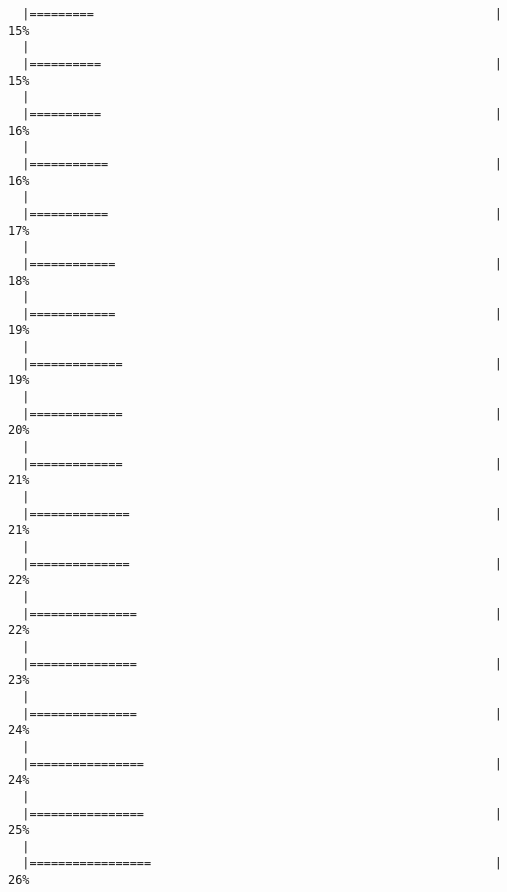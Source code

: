 \begin{knitrout}
\begin{kframe}
\begin{verbatim}
  |=========                                                        |  15%
  |                                                                       
  |==========                                                       |  15%
  |                                                                       
  |==========                                                       |  16%
  |                                                                       
  |===========                                                      |  16%
  |                                                                       
  |===========                                                      |  17%
  |                                                                       
  |============                                                     |  18%
  |                                                                       
  |============                                                     |  19%
  |                                                                       
  |=============                                                    |  19%
  |                                                                       
  |=============                                                    |  20%
  |                                                                       
  |=============                                                    |  21%
  |                                                                       
  |==============                                                   |  21%
  |                                                                       
  |==============                                                   |  22%
  |                                                                       
  |===============                                                  |  22%
  |                                                                       
  |===============                                                  |  23%
  |                                                                       
  |===============                                                  |  24%
  |                                                                       
  |================                                                 |  24%
  |                                                                       
  |================                                                 |  25%
  |                                                                       
  |=================                                                |  26%

\end{verbatim}
\end{kframe}
\end{knitrout}

